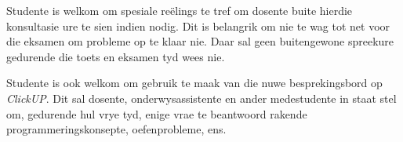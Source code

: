         Studente is welkom om spesiale re\"{e}lings te tref om dosente buite hierdie
        konsultasie ure te sien indien nodig.  Dit is belangrik om nie te wag tot 
        net voor die eksamen om probleme op te klaar nie.  Daar sal geen 
        buitengewone spreekure gedurende die toets en eksamen tyd wees nie.
        
        Studente is ook welkom om gebruik te maak van die nuwe
        besprekingsbord op \textit{ClickUP}.  Dit sal dosente,
        onderwysassistente en ander medestudente in staat stel om,
        gedurende hul vrye tyd, enige vrae te beantwoord rakende
        programmeringskonsepte, oefenprobleme, ens.
